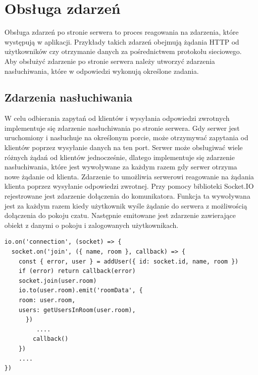 \section{Obsługa zdarzeń}
Obsługa zdarzeń po stronie serwera to proces reagowania na zdarzenia, które występują w aplikacji. Przykłady takich zdarzeń obejmują żądania HTTP od użytkowników czy otrzymanie danych za pośrednictwem protokołu sieciowego. Aby obsłużyć zdarzenie po stronie serwera należy utworzyć zdarzenia nasłuchiwania, które w odpowiedzi wykonują określone zadania.
\subsection{Zdarzenia nasłuchiwania}
W celu odbierania zapytań od klientów i wysyłania odpowiedzi zwrotnych implementuje się zdarzenie nasłuchiwania po stronie serwera. Gdy serwer jest uruchomiony i nasłuchuje na określonym porcie, może otrzymywać zapytania od klientów poprzez wysyłanie danych na ten port. Serwer może obsługiwać wiele różnych żądań od klientów jednocześnie, dlatego implementuje się zdarzenie nasłuchiwania, które jest wywoływane za każdym razem gdy serwer otrzyma nowe żądanie od klienta. Zdarzenie to umożliwia serwerowi reagowanie na żądania klienta poprzez wysyłanie odpowiedzi zwrotnej. 
Przy pomocy biblioteki Socket.IO rejestrowane jest zdarzenie dołączenia do komunikatora. Funkcja ta wywoływana jest za każdym razem kiedy użytkownik wyśle żądanie do serwera z możliwością dołączenia do pokoju czatu. Następnie emitowane jest zdarzenie zawierające obiekt z danymi o pokoju i zalogowanych użytkownikach.
\begin{lstlisting}[caption=Implementacja zdarzenia dolaczenia i pobierania danych]
io.on('connection', (socket) => {
  socket.on('join', ({ name, room }, callback) => {
    const { error, user } = addUser({ id: socket.id, name, room })
    if (error) return callback(error)
    socket.join(user.room)
    io.to(user.room).emit('roomData', {
    room: user.room,
    users: getUsersInRoom(user.room),
      })
         ....		
        callback()
    })
	....
})
\end{lstlisting}

